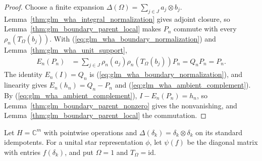 \begin{proof}
    \leanok
    Choose a finite expansion $\Delta(\Omega)=\sum_{j\in J}a_j\otimes b_j$.
    Lemma~\ref{thm:glm_wha_integral_normalization} gives adjoint closure,
    so Lemma~\ref{thm:glm_boundary_parent_local} makes $P_n$ commute with
    every $\rho_n(T_\Omega(b_j))$. With
    (\ref{eq:glm_wha_boundary_normalization}) and
    Lemma~\ref{thm:glm_wha_unit_support},
    \begin{align*}
        E_n(P_n) & =\sum_{j\in J}\rho_n(a_j)\rho_n(T_\Omega(b_j))P_n
        =Q_nP_n=P_n.
    \end{align*}
    The identity $E_n(I)=Q_n$ is
    (\ref{eq:glm_wha_boundary_normalization}), and linearity gives
    $E_n(h_n)=Q_n-P_n$ and (\ref{eq:glm_wha_ambient_complement}).
    By (\ref{eq:glm_wha_ambient_complement}), $I-E_n(P_n)=h_n$, so
    Lemma~\ref{thm:glm_boundary_parent_nonzero} gives the nonvanishing, and
    Lemma~\ref{thm:glm_boundary_parent_local} the commutation.
\end{proof}

\begin{definition}
    \label{def:glm_wha_finite_set}
    \leanok
    Let $H=\mathbb C^m$ with pointwise operations and
    $\Delta(\delta_k)=\delta_k\otimes\delta_k$ on its standard idempotents.
    For a unital star representation $\phi$, let $\psi(f)$ be the diagonal
    matrix with entries $f(\delta_k)$, and put $\Omega=1$ and
    $T_\Omega=\mathrm{id}$.
\end{definition}

